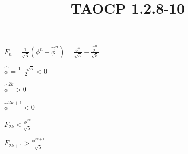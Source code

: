 \documentclass{article}
\title{TAOCP 1.2.8\mbox{-}10}
\begin{document}
\maketitle

\( F_{n} = \frac{1}{\sqrt{5}}(\phi^{n} - \widehat{\phi}^{n}) = \frac{\phi^{n}}{\sqrt{5}} - \frac{\widehat{\phi}^{n}}{\sqrt{5}} \)

\( \widehat{\phi} = \frac{1-\sqrt{5}}{2} < 0 \)

\( \widehat{\phi}^{2k} > 0 \)

\( \widehat{\phi}^{2k+1} < 0 \)

\( F_{2k} < \frac{\phi^{2k}}{\sqrt{5}} \)

\( F_{2k+1} > \frac{\phi^{2k+1}}{\sqrt{5}} \)
\end{document}
